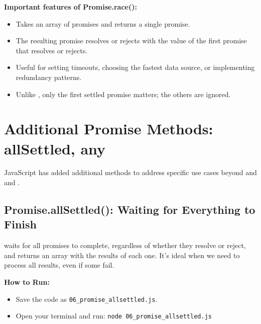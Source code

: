 \begin{macterminal}
  
\end{macterminal}

\textbf{Important features of Promise.race():}
\begin{itemize}
    \item Takes an array of promises and returns a single promise.
    \item The resulting promise resolves or rejects with the value of the first promise that resolves or rejects.
    \item Useful for setting timeouts, choosing the fastest data source, or implementing redundancy patterns.
    \item Unlike , only the first settled promise matters; the others are ignored.
\end{itemize}

\section{Additional Promise Methods: allSettled, any}

JavaScript has added additional methods to address specific use cases beyond  and  and .

\subsection{Promise.allSettled(): Waiting for Everything to Finish}

 waits for all promises to complete, regardless of whether they resolve or reject, and returns an array with the results of each one. It's ideal when we need to process all results, even if some fail.

\textbf{How to Run:}
\begin{itemize}
    \item Save the code as \verb|06_promise_allsettled.js|.
    \item Open your terminal and run: \verb|node 06_promise_allsettled.js|
\end{itemize}

\begin{macterminal}
  
\end{macterminal}

